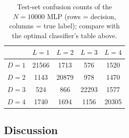 \documentclass[11pt]{article}
\begin{document}
\begin{table}[H]\centering
\begin{tabular}{lcccc}\toprule
 & $L=1$ & $L=2$ & $L=3$ & $L=4$\\\midrule
$D=1$ & 21566 & 1713 & 576 & 1520\\
$D=2$ & 1143 & 20879 & 978 & 1470\\
$D=3$ & 524 & 866 & 22293 & 1577\\
$D=4$ & 1740 & 1694 & 1156 & 20305\\
\bottomrule\end{tabular}
\caption{Test-set confusion counts of the $N=10000$ MLP (rows = decision, columns = true label); compare with the optimal classifier's table above.}
\end{table}

\subsection*{Discussion}
\end{document}
